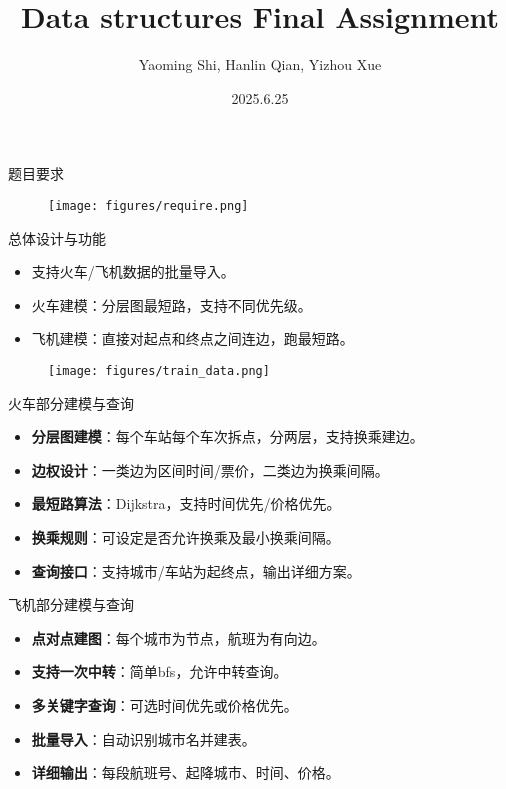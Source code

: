 \documentclass{beamer}
\title{Data structures Final Assignment}
\author{Yaoming Shi, Hanlin Qian, Yizhou Xue}
\institute{UCAS}
\date{2025.6.25}
\begin{document}
\maketitle

\begin{frame}{题目要求}
    \begin{figure}
        \centering
        \texttt{[image: figures/require.png]}
    \end{figure}
\end{frame}

\begin{frame}{总体设计与功能}
  \begin{itemize}
    \item 支持火车/飞机数据的批量导入。
    \item 火车建模：分层图最短路，支持不同优先级。
    \item 飞机建模：直接对起点和终点之间连边，跑最短路。
  \end{itemize}
  \begin{figure}
    \centering
    \texttt{[image: figures/train\_data.png]}
  \end{figure}
\end{frame}

\begin{frame}{火车部分建模与查询}
  \begin{itemize}
    \item \textbf{分层图建模}：每个车站每个车次拆点，分两层，支持换乘建边。
    \item \textbf{边权设计}：一类边为区间时间/票价，二类边为换乘间隔。
    \item \textbf{最短路算法}：Dijkstra，支持时间优先/价格优先。
    \item \textbf{换乘规则}：可设定是否允许换乘及最小换乘间隔。
    \item \textbf{查询接口}：支持城市/车站为起终点，输出详细方案。
  \end{itemize}
\end{frame}

\begin{frame}{飞机部分建模与查询}
  \begin{itemize}
    \item \textbf{点对点建图}：每个城市为节点，航班为有向边。
    \item \textbf{支持一次中转}：简单bfs，允许中转查询。
    \item \textbf{多关键字查询}：可选时间优先或价格优先。
    \item \textbf{批量导入}：自动识别城市名并建表。
    \item \textbf{详细输出}：每段航班号、起降城市、时间、价格。
  \end{itemize}
\end{frame}
\end{document}
